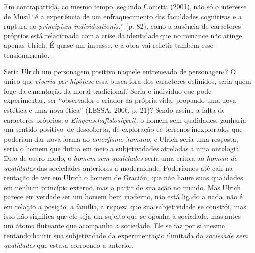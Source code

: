 Em contrapartida, ao mesmo tempo, segundo Cometti (2001), não só o
interesse de Musil ``é a experiência de um enfraquecimento das
faculdades cognitivas e a ruptura do \emph{principium}
\emph{individuationis.}'' (p. 82), como a ausência de caracteres
próprios está relacionada com a crise da identidade que no romance não
atinge apenas Ulrich. É quase um impasse, e a obra vai refletir também
esse tensionamento.

Seria Ulrich um personagem positivo naquele entremeado de personagens? O
único que \emph{viveria por hipótese} essa busca fora dos caracteres
definidos, seria quem foge da cimentação da moral tradicional? Seria o
indivíduo que pode experimentar, ser ``observador e criador da própria
vida, propondo uma nova estética e uma nova ética'' (LESSA, 2006, p.
21)? Sendo assim, a falta de caracteres próprios, o
\emph{Eingenschaftslosigkeit,} o homem sem qualidades, ganharia um
sentido positivo, de descoberta, de exploração de terrenos inexplorados
que poderiam dar nova forma ao \emph{amorfismo humano,} e Ulrich seria
uma resposta, seria o homem que flutua em meio a subjetividades
atreladas a uma ontologia. Dito de outro modo, o \emph{homem sem
qualidades} seria uma crítica ao \emph{homem de qualidades} das
sociedades anteriores à modernidade. Poderíamos até cair na tentação de
ver em Ulrich o homem de Gracián, que não haure suas qualidades em
nenhum princípio externo, mas a partir de sua ação no mundo. Mas Ulrich
parece em verdade ser um homem bem moderno, não está ligado a nada, não
é em relação a posição, a família, a riqueza que sua subjetividade se
constrói, mas isso não significa que ele seja um sujeito que se oponha à
sociedade, mas antes um átomo flutuante que acompanha a sociedade. Ele
se faz por si mesmo tentando haurir sua subjetividade da experimentação
ilimitada da \emph{sociedade sem qualidades} que estava corroendo a
anterior.

